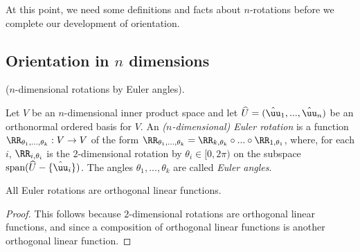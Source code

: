 At this point, we need some definitions and facts about $n$-rotations before we complete our development of orientation.

\subsection*{Orientation in $n$ dimensions}

\begin{defn}
    ($n$-dimensional rotations by Euler angles).

    Let $V$ be an $n$-dimensional inner product space and let $\hU = (\huu_1, ..., \huu_n)$ be an orthonormal ordered basis for $V$. An \textit{($n$-dimensional) Euler rotation} is a function $\RR_{\theta_1, ..., \theta_k}:V \rightarrow V$ of the form ${\RR_{\theta_1, ..., \theta_k} = \RR_{k, \theta_k} \circ ... \circ \RR_{1, \theta_1}}$, where, for each $i$, $\RR_{i, \theta_i}$ is the $2$-dimensional rotation by $\theta_i \in [0, 2\pi)$ on the subspace $\spann(\hU - \{\huu_i\})$. The angles $\theta_1, ..., \theta_k$ are called \textit{Euler angles}.
\end{defn}

\begin{theorem}
    All Euler rotations are orthogonal linear functions.
\end{theorem}

\begin{proof}
    This follows because $2$-dimensional rotations are orthogonal linear functions, and since a composition of orthogonal linear functions is another orthogonal linear function.
\end{proof}




